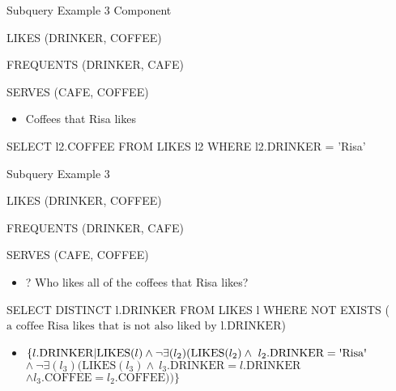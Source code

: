 \documentclass[aspectratio=169]{beamer}
\newenvironment{noindentitemize}
{ \begin{itemize}
 \setlength{\itemsep}{1.5ex}
  \setlength{\parsep}{0pt}   
  \setlength{\parskip}{0pt}
 \addtolength{\leftskip}{-2em}
 }
{ \end{itemize} }
\newcommand{\LIKES}{\textrm{LIKES}}
\newcommand{\COFFEE}{\textrm{COFFEE}}
\newcommand{\DRINKER}{\textrm{DRINKER}}
\begin{document}
\begin{frame}[fragile]{Subquery Example 3 Component}

LIKES (DRINKER, COFFEE)

FREQUENTS (DRINKER, CAFE)

SERVES (CAFE, COFFEE)


\begin{noindentitemize}
\item Coffees that Risa likes
\end{noindentitemize}

\begin{SQL}
SELECT l2.COFFEE
FROM LIKES l2
WHERE l2.DRINKER = 'Risa' 
\end{SQL}
\end{frame}



\begin{frame}[fragile]{Subquery Example 3}

LIKES (DRINKER, COFFEE)

FREQUENTS (DRINKER, CAFE)

SERVES (CAFE, COFFEE)


\begin{noindentitemize}
\item[?] Who likes all of the coffees that Risa likes?
\end{noindentitemize}

\begin{SQL}
SELECT DISTINCT l.DRINKER
FROM LIKES l
WHERE NOT EXISTS ($\textrm{a coffee Risa likes that is not also liked by l.DRINKER}$)
\end{SQL}
\begin{noindentitemize}
	\item[] $\{l.\DRINKER | \LIKES(l) \wedge \neg \exists(l_2)(\LIKES(l_2) \wedge\ 
	   l_2.\DRINKER = \textrm{\textquotesingle{Risa}\textquotesingle}$\\

           \hspace{2em}$\wedge\ \neg \exists(l_3)(\LIKES(l_3) \wedge\
		l_3.\DRINKER = l.\DRINKER $\\
	\hspace{2em}$\wedge l_3.\COFFEE = l_2.\COFFEE))\}$
\end{noindentitemize}


\end{frame}
\end{document}
